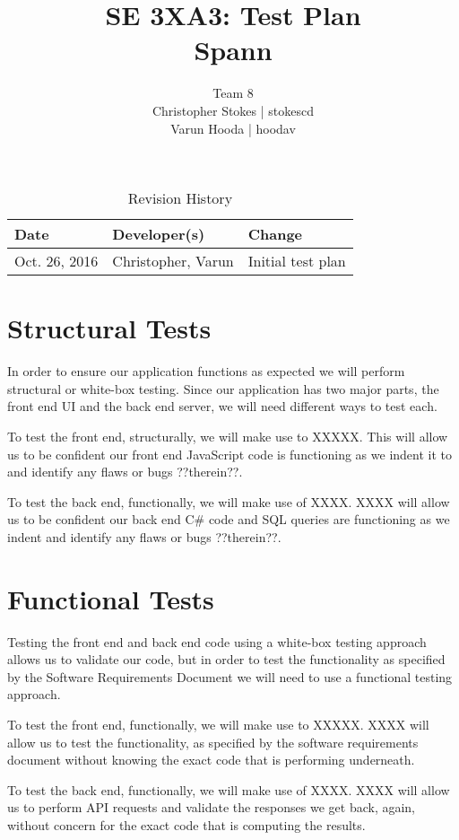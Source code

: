 \documentclass{article}
\title{SE 3XA3: Test Plan\\Spann}
\author{Team 8
		\\ Christopher Stokes | stokescd
		\\ Varun Hooda | hoodav
}
\date{}
\begin{document}
\begin{table}[hp]
\caption{Revision History} \label{TblRevisionHistory}
\begin{tabularx}{\textwidth}{llX}
\toprule
\textbf{Date} & \textbf{Developer(s)} & \textbf{Change}\\
\midrule
    Oct. 26, 2016 & Christopher, Varun & Initial test plan\\
\bottomrule
\end{tabularx}
\end{table}

\newpage

\maketitle

\section{Structural Tests}
In order to ensure our application functions as expected we will perform
structural or white-box testing. Since our application has two major parts,
the front end UI and the back end server, we will need different ways to test
each.

To test the front end, structurally, we will make use to XXXXX. This will allow
us to be confident our front end JavaScript code is functioning as we indent it
to and identify any flaws or bugs ??therein??.

To test the back end, functionally, we will make use of XXXX. XXXX will allow
us to be confident our back end C\# code and SQL queries are functioning as
we indent and identify any flaws or bugs ??therein??.

\section{Functional Tests}
Testing the front end and back end code using a white-box testing approach
allows us to validate our code, but in order to test the functionality as
specified by the Software Requirements Document we will need to use a
functional testing approach.

To test the front end, functionally, we will make use to XXXXX.
XXXX will allow us to test the functionality, as specified by the software
requirements document without knowing the exact code that is performing
underneath.

To test the back end, functionally, we will make use of XXXX. XXXX will allow
us to perform API requests and validate the responses we get back, again,
without concern for the exact code that is computing the results.
\end{document}
